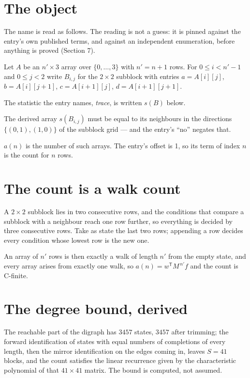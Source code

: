 \documentclass[11pt]{article}
\theoremstyle{definition}
\begin{document}
\section{The object}

The name is read as follows. The reading is not a guess: it is pinned against the entry's own published terms, and against an independent enumeration, before anything is proved (Section 7).

Let $A$ be an $n' \times 3$ array over $\{0,\dots,3\}$ with $n' = n + 1$ rows. For $0 \le i < n'-1$ and $0 \le j < 2$ write $B_{i,j}$ for the $2\times2$ subblock with entries $a = A[i][j]$, $b = A[i][j{+}1]$, $c = A[i{+}1][j]$, $d = A[i{+}1][j{+}1]$.

The statistic the entry names, {\itshape trace}, is written $s(B)$ below.

The derived array $s(B_{i,j})$ must be equal to its neighbours in the directions $\{(0,1), (1,0)\}$ of the subblock grid --- and the entry's ``no'' negates that.

$a(n)$ is the number of such arrays. The entry's offset is 1, so its term of index $n$ is the count for $n$ rows.

\section{The count is a walk count}

A $2\times2$ subblock lies in two consecutive rows, and the conditions that compare a subblock with a neighbour reach one row further, so everything is decided by three consecutive rows. Take as state the last two rows; appending a row decides every condition whose lowest row is the new one.

An array of $n'$ rows is then exactly a walk of length $n'$ from the empty state, and every array arises from exactly one walk, so $a(n) = w^{\mathsf T}M^{\,n'}f$ and the count is C-finite.

\section{The degree bound, derived}

The reachable part of the digraph has $3457$ states, $3457$ after trimming; the forward identification of states with equal numbers of completions of every length, then the mirror identification on the edges coming in, leaves $S = 41$ blocks, and the count satisfies the linear recurrence given by the characteristic polynomial of that $41\times41$ matrix. The bound is computed, not assumed.
\end{document}
